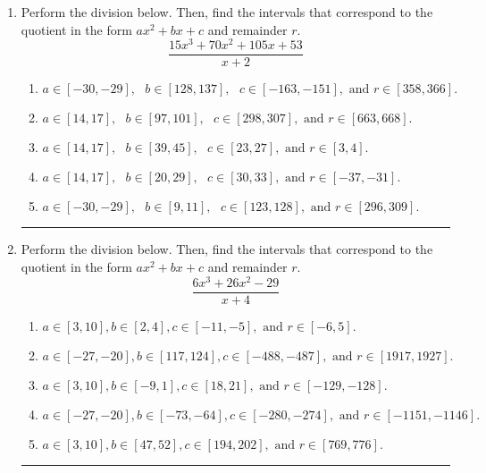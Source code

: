 \documentclass[14pt]{extbook}
\newcommand{\litem}[1]{\item#1\hspace*{-1cm}\rule{\textwidth}{0.4pt}}
\begin{document}
\begin{enumerate}
{\begin{enumerate}[label=\Alph*.]
\end{enumerate} }
\litem{
Perform the division below. Then, find the intervals that correspond to the quotient in the form $ax^2+bx+c$ and remainder $r$.\[ \frac{15x^{3} +70 x^{2} +105 x + 53}{x + 2} \]\begin{enumerate}[label=\Alph*.]
\item \( a \in [-30, -29], \text{   } b \in [128, 137], \text{   } c \in [-163, -151], \text{   and   } r \in [358, 366]. \)
\item \( a \in [14, 17], \text{   } b \in [97, 101], \text{   } c \in [298, 307], \text{   and   } r \in [663, 668]. \)
\item \( a \in [14, 17], \text{   } b \in [39, 45], \text{   } c \in [23, 27], \text{   and   } r \in [3, 4]. \)
\item \( a \in [14, 17], \text{   } b \in [20, 29], \text{   } c \in [30, 33], \text{   and   } r \in [-37, -31]. \)
\item \( a \in [-30, -29], \text{   } b \in [9, 11], \text{   } c \in [123, 128], \text{   and   } r \in [296, 309]. \)

\end{enumerate} }
\litem{
Perform the division below. Then, find the intervals that correspond to the quotient in the form $ax^2+bx+c$ and remainder $r$.\[ \frac{6x^{3} +26 x^{2} -29}{x + 4} \]\begin{enumerate}[label=\Alph*.]
\item \( a \in [3, 10], b \in [2, 4], c \in [-11, -5], \text{ and } r \in [-6, 5]. \)
\item \( a \in [-27, -20], b \in [117, 124], c \in [-488, -487], \text{ and } r \in [1917, 1927]. \)
\item \( a \in [3, 10], b \in [-9, 1], c \in [18, 21], \text{ and } r \in [-129, -128]. \)
\item \( a \in [-27, -20], b \in [-73, -64], c \in [-280, -274], \text{ and } r \in [-1151, -1146]. \)
\item \( a \in [3, 10], b \in [47, 52], c \in [194, 202], \text{ and } r \in [769, 776]. \)


\end{enumerate}}
\end{enumerate}
\end{document}

